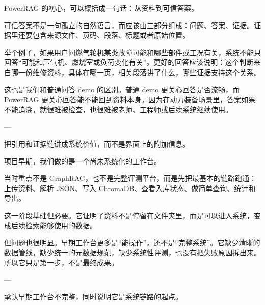 \documentclass[10pt, a4paper]{ctexart}
\begin{document}
\begin{tcolorbox}[colback=white, colframe=primary!35, title={\textbf{第 5 页：初心是把资料变成可信答案}}, beforeafter skip=2.0pt]
\begin{minipage}[t]{0.72\textwidth}
  \linespread{1.0}\selectfont\footnotesize
  PowerRAG 的初心，可以概括成一句话：从资料到可信答案。

可信答案不是一句孤立的自然语言，而应该由三部分组成：问题、答案、证据。证据里还要包含来源文件、页码、段落、标题或者原始位置。

举个例子，如果用户问燃气轮机某类故障可能和哪些部件或工况有关，系统不能只回答“可能和压气机、燃烧室或负荷变化有关”。更好的回答应该说明：这个判断来自哪一份维修资料，具体在哪一页，相关段落讲了什么，哪些证据支持这个关系。

这也是我们和普通问答 demo 的区别。普通 demo 更关心回答是否流畅，而 PowerRAG 更关心回答能不能回到资料本身。因为在动力装备场景里，答案如果不能追溯，就很难被检查，也很难被老师、工程师或后续系统继续使用。

---
\end{minipage}
\hfill
\begin{minipage}[t]{0.25\textwidth}
  \fontsize{7.5}{9.5}\selectfont
  \begin{tcolorbox}[colback=orange!5, colframe=orange!45, title=\textbf{讲述重点}, left=0.6mm, right=0.6mm, top=0.8mm, bottom=0.8mm, arc=0.8mm, boxrule=0.4pt, beforeafter skip=0pt]
    把引用和证据链讲成系统价值，而不是界面上的附加信息。
  \end{tcolorbox}
\end{minipage}
\end{tcolorbox}

\begin{tcolorbox}[colback=white, colframe=primary!35, title={\textbf{第 6 页：第一阶段先让工作台跑起来}}, beforeafter skip=2.0pt]
\begin{minipage}[t]{0.72\textwidth}
  \linespread{1.0}\selectfont\footnotesize
  项目早期，我们做的是一个尚未系统化的工作台。

当时重点不是 GraphRAG，也不是完整评测平台，而是先把最基本的链路跑通：上传资料、解析 JSON、写入 ChromaDB、查看入库状态、做简单查询、统计和导出。

这一阶段基础但必要。它证明了资料不是停留在文件夹里，而是可以进入系统，变成后续检索能够使用的数据。

但问题也很明显。早期工作台更多是“能操作”，还不是“完整系统”。它缺少清晰的数据管线，缺少统一的元数据规范，缺少系统性评测，也没有把失败原因拆出来。所以它只是第一步，不是最终成果。

---
\end{minipage}
\hfill
\begin{minipage}[t]{0.25\textwidth}
  \fontsize{7.5}{9.5}\selectfont
  \begin{tcolorbox}[colback=orange!5, colframe=orange!45, title=\textbf{讲述重点}, left=0.6mm, right=0.6mm, top=0.8mm, bottom=0.8mm, arc=0.8mm, boxrule=0.4pt, beforeafter skip=0pt]
    承认早期工作台不完整，同时说明它是系统链路的起点。
  \end{tcolorbox}
\end{minipage}
\end{tcolorbox}
\end{document}

